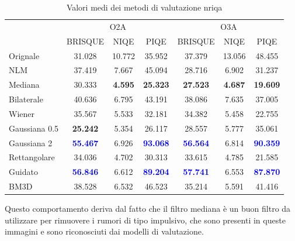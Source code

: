 \documentclass[../main.tex]{subfiles}
\begin{document}
\begin{table}[h]
	\centering
	\begin{tabular}{l||ccc||ccc}
		& \multicolumn{3}{c||}{O2A} & \multicolumn{3}{c}{O3A} \\
		& BRISQUE & NIQE & PIQE     & BRISQUE & NIQE  & PIQE\\ \hline\hline
		Orignale      & 31.028 & 10.772 & 35.952  & 37.379 & 13.056 & 48.455 \\
		NLM           & 37.419 & 7.667 & 45.094   & 28.716 & 6.902  & 31.237 \\
		Mediana       & 30.333 & \textbf{4.595} & \textbf{25.323}   & \textbf{27.523} & \textbf{4.687}  & \textbf{19.609} \\
		Bilaterale    & 40.636 & 6.795 & 43.191   & 38.086 & 7.635  & 37.005 \\
		Wiener        & 35.567 & 5.533 & 32.181   & 34.382 & 5.458  & 22.755 \\
		Gaussiana 0.5 & \textbf{25.242} & 5.354 & 26.117   & 28.557 & 5.777  & 35.061 \\
		Gaussiana 2   & \textcolor{blue}{\textbf{55.467}} & 6.926 & \textcolor{blue}{\textbf{93.068}}   & \textcolor{blue}{\textbf{56.564}} & 6.814  & \textcolor{blue}{\textbf{90.359}} \\
		Rettangolare  & 34.036 & 4.702 & 30.313   & 33.615 & 4.785  & 21.585 \\
		Guidato       & \textcolor{blue}{\textbf{56.846}} & 6.612 & \textcolor{blue}{\textbf{89.204}}   & \textcolor{blue}{\textbf{57.741}} & 6.553  & \textcolor{blue}{\textbf{87.870}} \\
		BM3D          & 38.528 & 6.532 & 46.523   & 35.214 & 5.591  & 41.416
	\end{tabular}
	\caption[Valori medi dei metodi di valutazione NR-IQA]{
		Valori medi dei metodi di valutazione \acrshort{nriqa}}
\end{table}

Questo comportamento deriva dal fatto che il filtro mediana è un buon filtro da utilizzare per rimuovere i rumori di tipo impulsivo, che sono presenti in queste immagini e sono riconosciuti dai modelli di valutazione.\medskip
\end{document}
